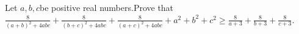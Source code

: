 Let $a,b,c $be positive real numbers.Prove that$\frac{8}{(a+b)^2 + 4abc} + \frac{8}{(b+c)^2 + 4abc} + \frac{8}{(a+c)^2 + 4abc} + a^2 + b^2 + c ^2 \ge \frac{8}{a+3} + \frac{8}{b+3} + \frac{8}{c+3}$.